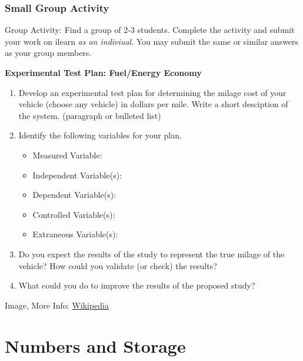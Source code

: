 \documentclass[fleqn]{beamer} %
\newcommand{\sectionIVtitle}{Numbers and Storage}
\newcommand{\sectionIIIsubsectionVtitle}{Small Group Activity}
\begin{document}
			\begin{frame}
				\frametitle{\sectionIIIsubsectionVtitle}
				\tiny

				Group Activity: Find a group of 2-3 students. Complete the activity and submit your work on ilearn {\it as an indiviual}. You may submit the same or similar answers as your group members.	

				\begin{multicols}{2}
					\textbf{Experimental Test Plan: Fuel/Energy Economy} \\

					\begin{enumerate}
						\item Develop an experimental test plan for determining the milage cost of your vehicle (choose any vehicle) in dollars per mile. Write a short desciption of the system. (paragraph or bulleted list)
						\vspace{5mm}
						\item Identify the following variables for your plan.

						\begin{multicols}{2}
							\begin{itemize}\tiny
								\item Measured Variable: 
								\item Independent Variable(s): 
								\item Dependent Variable(s): 
								\item Controlled Variable(s): 
								\item Extraneous Variable(s):
							\end{itemize}
						\end{multicols}	

						\vspace{12mm}
						\item Do you expect the results of the study to represent the true milage of the vehicle? How could you validate (or check) the results?
						\item What could you do to improve the results of the proposed study?

					\end{enumerate}
				\end{multicols}	

				{\tiny Image, More Info: \href{https://en.wikipedia.org/wiki/Thermocouple}{Wikipedia} }\hspace{40mm} 

			\end{frame}			


	\section{\sectionIVtitle}\label{sectionIV}
\end{document}
